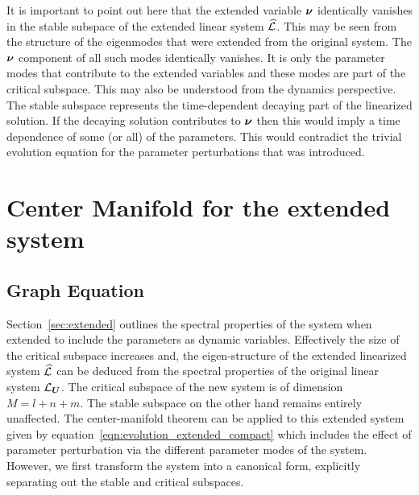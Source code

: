 It is important to point out here that the extended variable $\boldsymbol{\nu}$ identically vanishes in the stable subspace of the extended linear system $\mathcal{\widehat{L}}$. This may be seen from the structure of the eigenmodes that were extended from the original system. The $\boldsymbol{\nu}$ component of all such modes identically vanishes. It is only the parameter modes that contribute to the extended variables and these modes are part of the critical subspace. This may also be understood from the dynamics perspective. The stable subspace represents the time-dependent decaying part of the linearized solution. If the decaying solution contributes to $\boldsymbol{\nu}$ then this would imply a time dependence of some (or all) of the parameters. This would contradict the trivial evolution equation for the parameter perturbations that was introduced. 

\section{Center Manifold for the extended system}
\label{sec:center_manifold_derivation}

\subsection{Graph Equation}
\label{sec:graph_equation}

Section~\ref{sec:extended} outlines the spectral properties of the system when extended to include the parameters as dynamic variables. Effectively the size of the critical subspace increases and, the eigen-structure of the extended linearized system $\mathcal{\widehat{L}}$ can be deduced from the spectral properties of the original linear system $\mathcal{L}_{\boldsymbol{U}}$. The critical subspace of the new system is of dimension $M=l+n+m$. The stable subspace on the other hand remains entirely unaffected. The center-manifold theorem can be applied to this extended system given by equation~\eqref{eqn:evolution_extended_compact} which includes the effect of parameter perturbation via the different parameter modes of the system. However, we first transform the system into a canonical form, explicitly separating out the stable and critical subspaces. 

